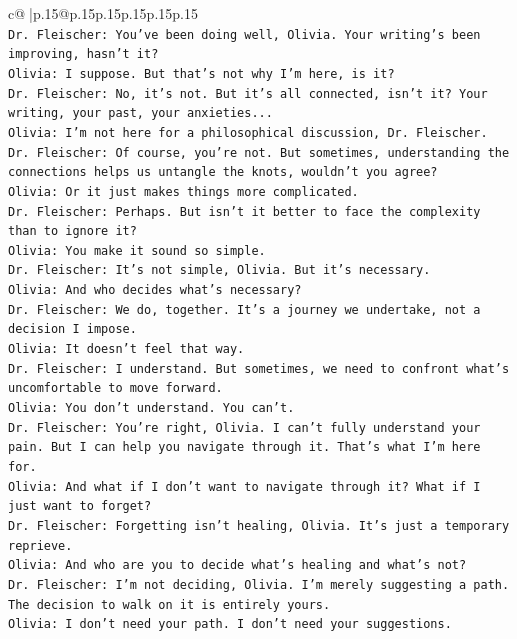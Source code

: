 \documentclass{article}
\begin{document}
{\begin{supertabular}{c@{$\;$}|p{.15\linewidth}@{}p{.15\linewidth}p{.15\linewidth}p{.15\linewidth}p{.15\linewidth}p{.15\linewidth}}
{{{\\ 
\texttt{Dr. Fleischer: You've been doing well, Olivia. Your writing's been improving, hasn't it?} \\
\texttt{Olivia: I suppose. But that's not why I'm here, is it?} \\
\texttt{Dr. Fleischer: No, it's not. But it's all connected, isn't it? Your writing, your past, your anxieties...} \\
\texttt{Olivia: I'm not here for a philosophical discussion, Dr. Fleischer.} \\
\texttt{Dr. Fleischer: Of course, you're not. But sometimes, understanding the connections helps us untangle the knots, wouldn't you agree?} \\
\texttt{Olivia: Or it just makes things more complicated.} \\
\texttt{Dr. Fleischer: Perhaps. But isn't it better to face the complexity than to ignore it?} \\
\texttt{Olivia: You make it sound so simple.} \\
\texttt{Dr. Fleischer: It's not simple, Olivia. But it's necessary.} \\
\texttt{Olivia: And who decides what's necessary?} \\
\texttt{Dr. Fleischer: We do, together. It's a journey we undertake, not a decision I impose.} \\
\texttt{Olivia: It doesn't feel that way.} \\
\texttt{Dr. Fleischer: I understand. But sometimes, we need to confront what's uncomfortable to move forward.} \\
\texttt{Olivia: You don't understand. You can't.} \\
\texttt{Dr. Fleischer: You're right, Olivia. I can't fully understand your pain. But I can help you navigate through it. That's what I'm here for.} \\
\texttt{Olivia: And what if I don't want to navigate through it? What if I just want to forget?} \\
\texttt{Dr. Fleischer: Forgetting isn't healing, Olivia. It's just a temporary reprieve.} \\
\texttt{Olivia: And who are you to decide what's healing and what's not?} \\
\texttt{Dr. Fleischer: I'm not deciding, Olivia. I'm merely suggesting a path. The decision to walk on it is entirely yours.} \\
\texttt{Olivia: I don't need your path. I don't need your suggestions.} \\
}}}
\end{supertabular}}
\end{document}

